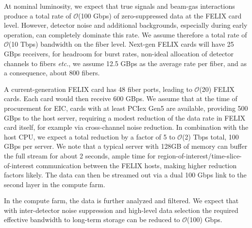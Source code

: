 At nominal luminosity, we expect that true signals and beam-gas interactions produce a total rate of $\mathcal{O}$(100 Gbps) of zero-suppressed data at the FELIX card level. However, detector noise and additional backgrounds, especially during early operation, can completely dominate this rate. We assume therefore a total rate of $\mathcal{O}$(10 Tbps) bandwidth on the fiber level. Next-gen FELIX cards will have 25 GBps receivers, for headroom for burst rates, non-ideal allocation of detector channels to fibers \emph{etc.}, we assume 12.5 GBps as the average rate per fiber, and as a consequence, about 800 fibers.

A current-generation FELIX card has 48 fiber ports, leading to $\mathcal{O}$(20) FELIX cards. Each card would then receive 600 GBps. We assume that at the time of procurement for EIC, cards with at least PCIex Gen5 are available, providing 500 GBps to the host server, requiring a modest reduction of the data rate in FELIX card itself, for example via cross-channel noise reduction. In combination with the host CPU, we expect a total reduction by a factor of 5 to $\mathcal{O}$(2) Tbps total, 100 GBps per server. We note that a typical server with 128GB of memory can buffer the full stream for about 2 seconds, ample time for region-of-interest/time-slice-of-interest communication between the FELIX hosts, making higher reduction factors likely. The data can then be streamed out via a dual 100 Gbps link to the second layer in the compute farm.

In the compute farm, the data is further analyzed and filtered. We expect that with inter-detector noise suppression and high-level data selection the required effective bandwidth to long-term storage can be reduced to $\mathcal{O}$(100) Gbps.  






